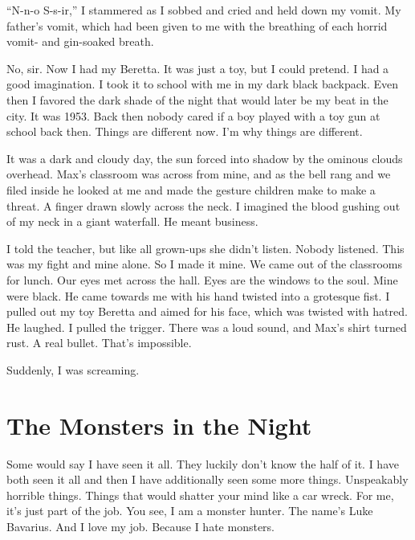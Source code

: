 ``N-n-o S-s-ir,'' I stammered as I sobbed and cried and
held down my vomit. My father's vomit, which had been given
to me with the breathing of each horrid vomit- and gin-soaked
breath.



No, sir. Now I had my Beretta. It was just a toy, but I could
pretend. I had a good imagination. I took it to school with me in
my dark black backpack. Even then I favored the dark shade of the
night that would later be my beat in the city. It was 1953. Back
then nobody cared if a boy played with a toy gun at school back
then. Things are different now. I'm why things are
different.



It was a dark and cloudy day, the sun forced into shadow by the
ominous clouds overhead. Max's classroom was across from
mine, and as the bell rang and we filed inside he looked at me and
made the gesture children make to make a threat. A finger drawn
slowly across the neck. I imagined the blood gushing out of my neck
in a giant waterfall. He meant business.



I told the teacher, but like all grown-ups she didn't listen.
Nobody listened. This was my fight and mine alone. So I made it
mine. We came out of the classrooms for lunch. Our eyes met across
the hall. Eyes are the windows to the soul. Mine were black. He
came towards me with his hand twisted into a grotesque fist. I
pulled out my toy Beretta and aimed for his face, which was twisted
with hatred. He laughed. I pulled the trigger. There was a loud
sound, and Max's shirt turned rust. A real bullet.
That's impossible.



Suddenly, I was screaming. 
 





\chapter{The Monsters in the Night}



Some would say I have seen it all. They luckily don't know
the half of it. I have both seen it all and then I have
additionally seen some more things. Unspeakably horrible things.
Things that would shatter your mind like a car wreck. For me,
it's just part of the job. You see, I am a monster hunter.
The name's Luke Bavarius. And I love my job. Because I hate
monsters.



